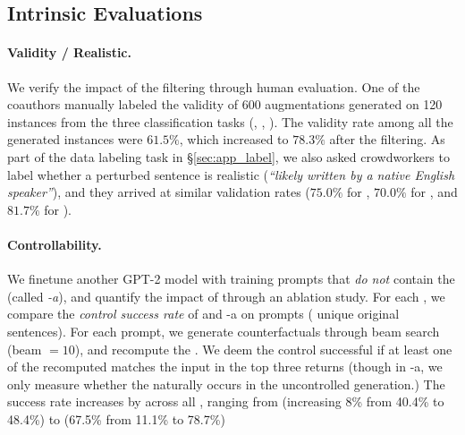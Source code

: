 



\subsection{Intrinsic Evaluations}
\label{subsec:intrinsic}
\paragraph{Validity / Realistic.}
We verify the impact of the filtering through human evaluation.
One of the coauthors manually labeled the validity of 600 augmentations generated on 120 instances from the three classification tasks (\sst, \nli, \qqp).
The validity rate among all the generated instances were $61.5\%$, which increased to $78.3\%$ after the filtering. 
As part of the data labeling task in \S\ref{sec:app_label}, we also asked crowdworkers to label whether a perturbed sentence is realistic (\emph{``likely written by a native English speaker''}), and they arrived at similar validation rates ($75.0\%$ for \dsst, $70.0\%$ for \dqqp, and $81.7\%$ for \dnli).


\paragraph{Controllability.}
We finetune another GPT-2 model with training prompts that \emph{do not} contain the \tagstrshorts (called \emph{\sysname-a}), and quantify the impact of \tagstrs through an ablation study.
For each \tagstr, we compare the \emph{control success rate} of \sysname and \sysname-a on  prompts ( unique original sentences).
For each prompt, we generate counterfactuals through beam search (beam $=10$), and recompute the \tagstrshorts.
We deem the control successful if at least one of the recomputed \tagstrshort matches the input in the top three returns (though in \sysname-a, we only measure whether the \tagstrshort naturally occurs in the uncontrolled generation.)
The success rate increases by  across all \tagstrs, ranging from  (increasing 8\% from 40.4\% to 48.4\%) to  (67.5\% from 11.1\% to 78.7\%)

